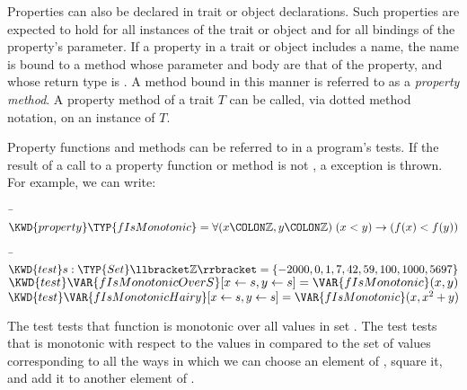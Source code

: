 Properties can also be declared in trait or object declarations. Such
properties are expected to hold for all instances of the trait or object
and for all bindings of the property's parameter. If a property in a trait
or object includes a name, the name is bound to a method whose parameter
and body are that of the property, and whose return type is
.
A method bound in this manner is referred to as a \emph{property
  method}. A property method of a trait $T$ can be called,
via dotted method notation, on an instance of $T$.

Property functions and methods can be referred to in a program's tests.
If the result of a call to a property function or method is not
, a  exception is thrown. For example, we can
write:
\begin{Fortress}
{\tt~}\pushtabs\=\+\( \KWD{property} \TYP{fIsMonotonic} = \forall(x\COLON \mathbb{Z}, y\COLON \mathbb{Z})\; (x < y) \rightarrow (f(x) < f(y))\)\-\\\poptabs
\end{Fortress}
\begin{Fortress}
{\tt~}\pushtabs\=\+\( \KWD{test} s \mathrel{\mathtt{:}} \TYP{Set}\llbracket\mathbb{Z}\rrbracket = \{-2000, 0, 1, 7, 42, 59, 100, 1000, 5697\}\)\\
\( \KWD{test} \VAR{fIsMonotonicOverS} [x \leftarrow s, y \leftarrow s] = \VAR{fIsMonotonic}(x,y)\)\\
\( \KWD{test} \VAR{fIsMonotonicHairy} [x \leftarrow s, y \leftarrow s] = \VAR{fIsMonotonic}(x, x^{2} + y)\)\-\\\poptabs
\end{Fortress}
The test  tests that function  is
monotonic
over all values in set . The test 
tests that  is monotonic with respect to the values in 
compared to the set of values corresponding to all the ways in which
we can choose an element of , square it,
and add it to another element of .
